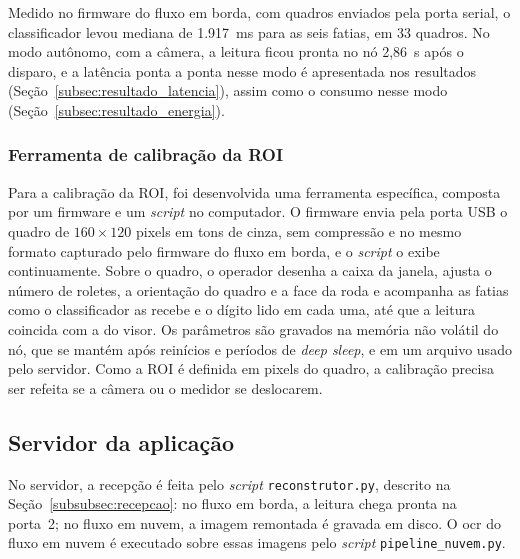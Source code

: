 Medido no
firmware do fluxo em borda, com quadros enviados pela porta serial, o classificador levou
mediana de 1.917~ms para as seis fatias, em 33 quadros. No modo autônomo, com a câmera, a
leitura ficou pronta no nó 2,86~s após o disparo, e a latência ponta a ponta nesse modo é
apresentada nos resultados (Seção~\ref{subsec:resultado_latencia}), assim como o consumo
nesse modo (Seção~\ref{subsec:resultado_energia}).

\subsubsection{Ferramenta de calibração da ROI}
\label{subsubsec:firmware_debug}

Para a calibração da ROI, foi desenvolvida uma ferramenta específica, composta por
um firmware e um \textit{script} no computador. O firmware envia pela porta USB o quadro de
$160 \times 120$ pixels em tons de cinza, sem compressão e no mesmo formato capturado pelo
firmware do fluxo em borda, e o \textit{script} o exibe continuamente. Sobre o quadro, o
operador desenha a caixa da janela, ajusta o número de roletes, a orientação do quadro e a
face da roda e acompanha as fatias como o classificador as recebe e o dígito lido em cada
uma, até que a leitura coincida com a do visor. Os parâmetros são gravados na memória não
volátil do nó, que se mantém após reinícios e períodos de \textit{deep sleep}, e em um
arquivo usado pelo servidor. Como a ROI é definida em pixels do quadro, a calibração
precisa ser refeita se a câmera ou o medidor se deslocarem.

\subsection{Servidor da aplicação}
\label{subsec:servidor}

No servidor, a recepção é feita pelo \textit{script} \texttt{reconstrutor.py}, descrito na
Seção~\ref{subsubsec:recepcao}: no fluxo em borda, a leitura chega pronta na porta~2; no
fluxo em nuvem, a imagem remontada é gravada em disco. O \gls{ocr} do fluxo em nuvem é
executado sobre essas imagens pelo \textit{script} \texttt{pipeline\_nuvem.py}.

